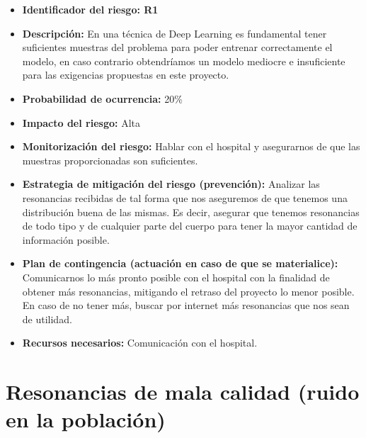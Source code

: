 \begin{itemize}
	\item \textbf{Identificador del riesgo: R1 }
	\item \textbf{Descripción: } En una técnica de Deep Learning es fundamental tener suficientes muestras del problema para poder entrenar correctamente el modelo, en caso contrario obtendríamos un modelo mediocre e insuficiente para las exigencias propuestas en este proyecto.
	\item \textbf{Probabilidad de ocurrencia: } 20\%
	\item \textbf{Impacto del riesgo: } Alta
	\item \textbf{Monitorización del riesgo: } Hablar con el hospital y asegurarnos de que las muestras proporcionadas son suficientes.  
	\item \textbf{Estrategia de mitigación del riesgo (prevención): } Analizar las resonancias recibidas de tal forma que nos aseguremos de que tenemos una distribución buena de las mismas. Es decir, asegurar que tenemos resonancias de todo tipo y de cualquier parte del cuerpo para tener la mayor cantidad de información posible.  
	\item \textbf{Plan de contingencia (actuación en caso de que se materialice): } Comunicarnos lo más pronto posible con el hospital con la finalidad de obtener más resonancias, mitigando el retraso del proyecto lo menor posible. En caso de no tener más, buscar por internet más resonancias que nos sean de utilidad.
	\item \textbf{Recursos necesarios: } Comunicación con el hospital.
\end{itemize}

\section{Resonancias de mala calidad (ruido en la población)}

